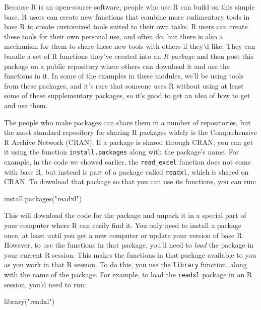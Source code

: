 \documentclass[]{tufte-book}
\newenvironment{Shaded}{}{}
\newcommand{\FunctionTok}[1]{\textcolor[rgb]{0.02,0.16,0.49}{#1}}
\newcommand{\NormalTok}[1]{#1}
\newcommand{\StringTok}[1]{\textcolor[rgb]{0.25,0.44,0.63}{#1}}
\begin{document}
Because R is an open-source software, people who use R can build on this
simple base. R users can create new functions that combine more rudimentary
tools in base R to create customized tools suited to their own tasks. R users
can create these tools for their own personal use, and often do, but there is
also a mechanism for them to share these new tools with others if they'd like.
They can bundle a set of R functions they've created into an \emph{R package} and
then post this package on a public repository where others can download it and
use the functions in it. In some of the examples in these modules, we'll be
using tools from these packages, and it's rare that someone uses R without using
at least some of these supplementary packages, so it's good to get an idea of
how to get and use them.

The people who make packages can share them in a number of repositories, but the
most standard repository for sharing R packages widely is the Comprehensive R
Archive Network (CRAN). If a package is shared through CRAN, you can get it
using the function \texttt{install.packages} along with the package's name. For
example, in the code we showed earlier, the \texttt{read\_excel} function does not come
with base R, but instead is part of a package called \texttt{readxl}, which is shared
on CRAN. To download that package so that you can use its functions, you can
run:

\begin{Shaded}
\begin{Highlighting}[]
\FunctionTok{install.packages}\NormalTok{(}\StringTok{"readxl"}\NormalTok{)}
\end{Highlighting}
\end{Shaded}

This will download the code for the package and unpack it in a special part of
your computer where R can easily find it. You only need to install a package
once, at least until you get a new computer or update your version of base R.
However, to use the functions in that package, you'll need to \emph{load} the package
in your current R session. This makes the functions in that package available to
you as you work in that R session. To do this, you use the \texttt{library} function,
along with the name of the package. For example, to load the \texttt{readxl} package in
an R session, you'd need to run:

\begin{Shaded}
\begin{Highlighting}[]
\FunctionTok{library}\NormalTok{(}\StringTok{"readxl"}\NormalTok{)}
\end{Highlighting}
\end{Shaded}
\end{document}
